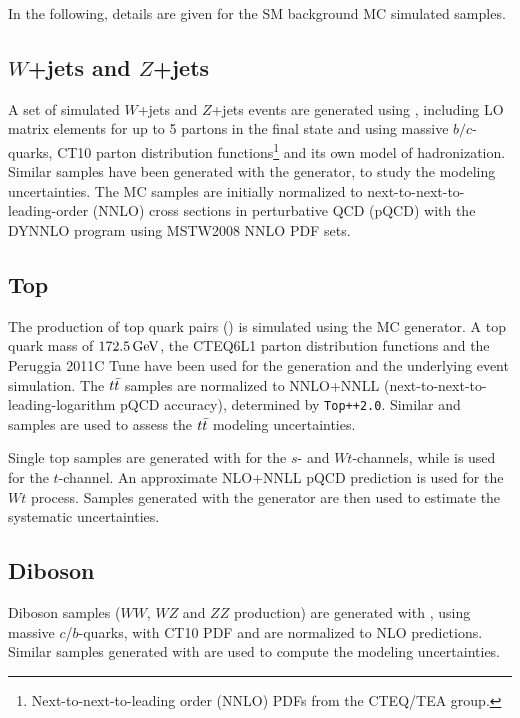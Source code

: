 In the following, details are given for the SM background MC simulated samples.


\subsection{$W$+jets and $Z$+jets}
    \label{subsec:WZjetsMCSimulation}

A set of simulated $W$+jets and $Z$+jets events are generated using \sherpa{}, including LO matrix elements for up to 5 partons in the final state and using massive $b/c$-quarks, CT10 parton distribution functions\footnote{Next-to-next-to-leading order (NNLO) PDFs from the CTEQ/TEA group.} and its own model of hadronization.
Similar samples have been generated with the \alpgen{} generator, to study the modeling uncertainties.
The MC samples are initially normalized to next-to-next-to-leading-order (NNLO) cross sections in perturbative QCD (pQCD) with the DYNNLO \cite{Catani:2007vq} program using MSTW2008 NNLO PDF sets.


\subsection{Top} 
    \label{subsec:TopSimulation}

The production of top quark pairs (\ttbar) is simulated using the \powheg{} MC generator.
A top quark mass of $\unit[172.5]{GeV}$, the CTEQ6L1 parton distribution functions and the Peruggia 2011C Tune \cite{Skands:2010ak} have been used for the generation and the underlying event simulation.
The $t\bar{t}$ samples are normalized to NNLO+NNLL (next-to-next-to-leading-logarithm pQCD accuracy), determined by \texttt{Top++2.0}.
Similar \alpgen{} and \mcnlo{} samples are used to assess the $t\bar{t}$ modeling uncertainties.

Single top samples are generated with \powheg{} for the $s$- and $Wt$-channels, while \acer{} \cite{Kersevan:2002dd} is used for the $t$-channel.
An approximate NLO+NNLL pQCD prediction is used for the $Wt$ process.
Samples generated with the \mcnlo{} generator are then used to estimate the systematic uncertainties.

\subsection{Diboson}
    \label{subsec:DibosonSimulation}

Diboson samples ($WW$, $WZ$ and $ZZ$ production) are generated with \sherpa{}, using massive $c$/$b$-quarks, with CT10 PDF and are normalized to NLO predictions.
Similar samples generated with \herwig{} are used to compute the modeling uncertainties.



